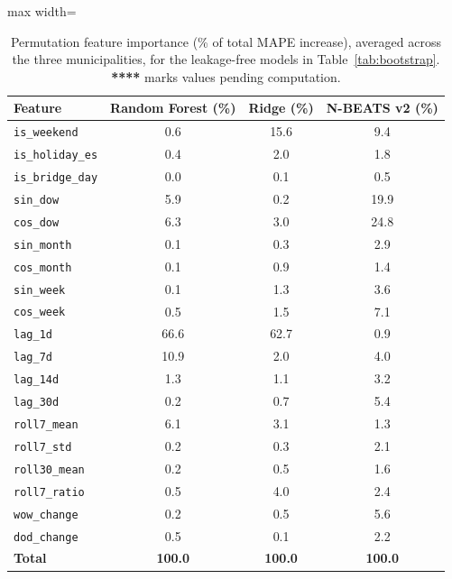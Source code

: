 ﻿\documentclass[12pt,reqno, twoside]{amsbook}
\numberwithin{figure}{chapter}
\numberwithin{table}{chapter}
\numberwithin{equation}{chapter}
\theoremstyle{plain}
\numberwithin{equation}{chapter}
\numberwithin{section}{chapter}
\begin{document}
\begin{table}[htbp]
\centering
\caption{Permutation feature importance (\% of total \ac{MAPE} increase), averaged across the three municipalities, for the leakage-free models in Table~\ref{tab:bootstrap}. \textbf{****} marks values pending computation.}
\label{tab:feature_importance_top3}
\begin{adjustbox}{max width=\textwidth}
\begin{tabular}{lccc}
\toprule
\textbf{Feature} & \textbf{Random Forest (\%)} & \textbf{Ridge (\%)} & \textbf{N-BEATS v2 (\%)} \\
\midrule
\texttt{is\_weekend}    & 0.6 & 15.6 & 9.4 \\
\texttt{is\_holiday\_es} & 0.4 & 2.0 & 1.8 \\
\texttt{is\_bridge\_day} & 0.0 & 0.1 & 0.5 \\
\texttt{sin\_dow}       & 5.9 & 0.2 & 19.9 \\
\texttt{cos\_dow}       & 6.3 & 3.0 & 24.8 \\
\texttt{sin\_month}     & 0.1 & 0.3 & 2.9 \\
\texttt{cos\_month}     & 0.1 & 0.9 & 1.4 \\
\texttt{sin\_week}      & 0.1 & 1.3 & 3.6 \\
\texttt{cos\_week}      & 0.5 & 1.5 & 7.1 \\
\midrule
\texttt{lag\_1d}      & 66.6 & 62.7 & 0.9 \\
\texttt{lag\_7d}      & 10.9 & 2.0 & 4.0 \\
\texttt{lag\_14d}     & 1.3 & 1.1 & 3.2 \\
\texttt{lag\_30d}     & 0.2 & 0.7 & 5.4 \\
\texttt{roll7\_mean}  & 6.1 & 3.1 & 1.3 \\
\texttt{roll7\_std}   & 0.2 & 0.3 & 2.1 \\
\texttt{roll30\_mean} & 0.2 & 0.5 & 1.6 \\
\texttt{roll7\_ratio} & 0.5 & 4.0 & 2.4 \\
\texttt{wow\_change}  & 0.2 & 0.5 & 5.6 \\
\texttt{dod\_change}  & 0.5 & 0.1 & 2.2 \\
\midrule
\textbf{Total} & \textbf{100.0} & \textbf{100.0} & \textbf{100.0} \\
\bottomrule
\end{tabular}
\end{adjustbox}
\end{table}

\FloatBarrier
\end{document}
